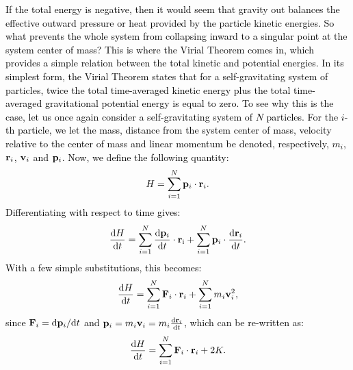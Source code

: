 \documentclass[main.tex]{subfiles}
\begin{document}
\begin{tcolorbox}[sharp corners, colback=green!30, colframe=green!80!blue, title=Box \refstepcounter{educhap2}\label{boxchap2:vt}\ref{boxchap2:vt} -- Virial Theorem]
\par \textcolor{black} {If the total energy is negative, then it would seem that gravity out balances the effective outward pressure or heat provided by the particle kinetic energies.  So what prevents the whole system from collapsing inward to a singular point at the system center of mass?  This is where the Virial Theorem comes in, which provides a simple relation between the total kinetic and potential energies.  In its simplest form, the Virial Theorem states that for a self-gravitating system of particles, twice the total time-averaged kinetic energy plus the total time-averaged gravitational potential energy is equal to zero.  To see why this is the case, let us once again consider a self-gravitating system of $N$ particles.  For the $i$-th particle, we let the mass, distance from the system center of mass, velocity relative to the center of mass and linear momentum be denoted, respectively, $m_i$, ${\mathbf{r}}_i$, ${\mathbf{v}}_i$ and ${\mathbf{p}}_i$.   Now, we define the following quantity:
\begin{equation}
H = \sum_{i=1}^{N} {\mathbf{p}}_{i} \cdot {\mathbf{r}}_i.
\end{equation}
Differentiating with respect to time gives:
\begin{equation}
\frac{\mathrm{d}H}{\mathrm{d}t} =  \sum_{i=1}^{N} \frac{\mathrm{d}{\mathbf{p}}_i}{\mathrm{d}t} \cdot {\mathbf{r}}_{\rm i} + \sum_{i=1}^{N} {\mathbf{p}}_{i} \cdot \frac{\mathrm{d}{\mathbf{r}}_i}{\mathrm{d}t}.
\end{equation}
With a few simple substitutions, this becomes:
\begin{equation}
\frac{\mathrm{d}H}{\mathrm{d}t} =  \sum_{i=1}^{N} {\mathbf{F}}_i \cdot {\mathbf{r}}_i + \sum_{i=1}^{N} m_i{\mathbf{v}}_i^2,
\end{equation}
since ${\mathbf{F}}_i = \mathrm{d}{\mathbf{p}}_i/\mathrm{d}t$ and ${\mathbf{p}}_i = m_i{\mathbf{v}}_i = m_i\frac{\mathrm{d}{\mathbf{r}}_i}{\mathrm{d}t}$,
which can be re-written as:
\begin{equation}
\frac{\mathrm{d}H}{\mathrm{d}t} =  \sum_{i=1}^{N} {\mathbf{F}}_i \cdot {\mathbf{r}}_i + 2K.
\label{eqn:dhdt}
\end{equation}
}
\end{tcolorbox}
\end{document}
